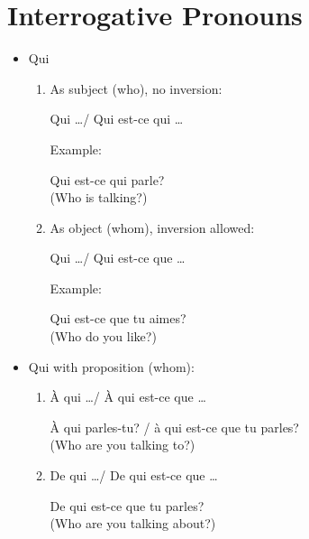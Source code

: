 \documentclass{book}
\begin{document}
    \section{Interrogative Pronouns}
        \begin{itemize}
            \item Qui
                \begin{enumerate}
                    \item As subject (who), no inversion:
                        \begin{center}
                            Qui \dots / Qui est-ce qui \dots
                        \end{center}
                        Example:
                            \begin{center}
                                Qui est-ce qui parle? \\
                                (Who is talking?)
                            \end{center}

                    \item As object (whom), inversion allowed:
                        \begin{center}
                            Qui \dots / Qui est-ce que \dots
                        \end{center}
                        Example:
                            \begin{center}
                                Qui est-ce que tu aimes? \\
                                (Who do you like?)
                            \end{center}
                \end{enumerate}
            
            \item Qui with proposition (whom): 
                \begin{enumerate}
                    \item À qui \dots / À qui est-ce que \dots
                        \begin{center}
                            À qui parles-tu? / à qui est-ce que tu parles? \\
                            (Who are you talking to?)
                        \end{center}

                    \item De qui \dots / De qui est-ce que \dots
                        \begin{center}
                            De qui est-ce que tu parles? \\
                            (Who are you talking about?)
                        \end{center}


\end{enumerate}
\end{itemize}
\end{document}
